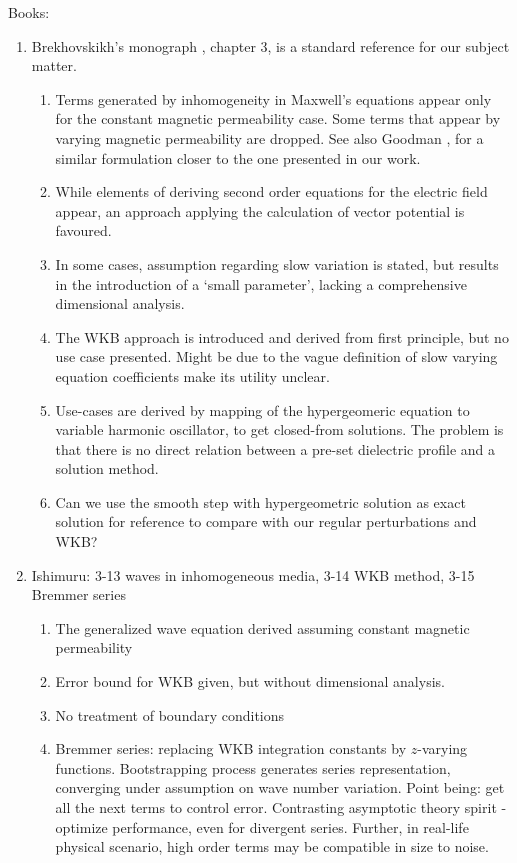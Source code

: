 \documentclass[twocolumn,secnumarabic,amssymb, nobibnotes, aps, prd]{revtex4-1}
\begin{document}
Books:
\begin{enumerate}
\item Brekhovskikh's monograph \cite{Brekhovskikh1960}, chapter 3, is a standard reference for our subject matter. 
\begin{enumerate}
\item Terms generated by inhomogeneity in Maxwell's equations appear only for the constant magnetic permeability case. Some terms that appear by varying magnetic permeability are dropped. See also Goodman \cite{goodman2005introduction}, for a similar formulation closer to the one presented in our work. 
\item While elements of deriving second order  equations for the electric field appear, an approach applying the calculation of vector potential is favoured.
\item In some cases, assumption regarding slow variation is stated, but results in the introduction of a `small parameter', lacking a comprehensive dimensional analysis.
\item The WKB approach is introduced and derived from first principle, but no use case presented. Might be due to the vague definition of slow varying equation coefficients make its utility unclear.
\item Use-cases are derived by mapping of the hypergeomeric equation to variable harmonic oscillator, to get closed-from solutions. The problem is that there is no direct relation between a pre-set dielectric profile and a solution method. 
\item Can we use the smooth step with hypergeometric solution as exact solution for reference to compare with our regular perturbations and WKB?
\end{enumerate}
\item Ishimuru: 3-13 waves in inhomogeneous media, 3-14 WKB method, 3-15 Bremmer series
\begin{enumerate}
\item The generalized wave equation derived assuming constant magnetic permeability
\item Error bound for WKB given, but without dimensional analysis.
\item No treatment of boundary conditions 
\item Bremmer series: replacing WKB integration constants by $z$-varying functions. Bootstrapping process generates series  representation, converging under assumption on wave number variation. Point being: get all the next terms to control error. Contrasting asymptotic theory spirit - optimize performance, even for divergent series.  Further, in real-life physical scenario, high order terms may be compatible in size to noise. 

\end{enumerate}
\end{enumerate}
\end{document}
